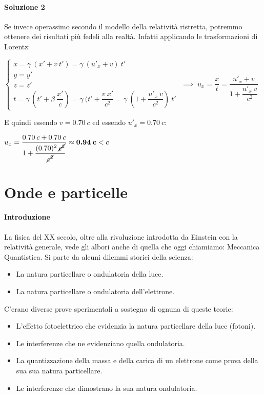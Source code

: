 \documentclass[a4paper,12pt]{report}
\begin{document}
\paragraph{Soluzione 2} Se invece operassimo secondo il modello della relatività ristretta, potremmo ottenere dei risultati più fedeli alla realtà. Infatti applicando le trasformazioni di Lorentz:
\begin{center}
      $\begin{cases}
        x=\gamma\:(x' + v\:t') = \gamma\:(u'_x + v)\:t'\\
        y=y'\\
        z=z'\\
        t=\gamma\:(t' + \beta\:\dfrac{x'}{c}) = \gamma\:(t' + \dfrac{v\:x'}{c^2} = \gamma\;(1 +\dfrac{u'_x\:v}{c^2})\:t'
      \end{cases}
      \;\implies\;
      u_x=\dfrac{x}{t} = \dfrac{u'_x + v}{1 +\dfrac{u'_x\:v}{c^2}}$
\end{center}
E quindi essendo $v=0.70\:c$ ed essendo $u'_x=0.70\:c$:
\begin{center}
$u_x= \dfrac{0.70\:c + 0.70\:c}{1 + \dfrac{(0.70)^2\:\cancel{c^2}}{\cancel{c^2}}} \approx \textbf{0.94\:c}<c$
\end{center}

\section{Onde e particelle}
\paragraph{Introduzione}La fisica del XX secolo, oltre alla rivoluzione introdotta da Einstein con la relatività generale, vede gli albori anche di quella che oggi chiamiamo: Meccanica Quantistica.
Si parte da alcuni dilemmi storici della scienza:
\begin{itemize}
\item La natura particellare o ondulatoria della luce.
\item La natura particellare o ondulatoria dell’elettrone.
\end{itemize}
C’erano diverse prove sperimentali a sostegno di ognuna di queste teorie:
\begin{itemize}
\item L’effetto fotoelettrico che evidenzia la natura particellare della luce (fotoni).
\item Le interferenze che ne evidenziano quella ondulatoria.
\item La quantizzazione della massa e della carica di un elettrone come prova della sua sua natura particellare.
\item Le interferenze che dimostrano la sua natura ondulatoria.
\end{itemize}
\end{document}
